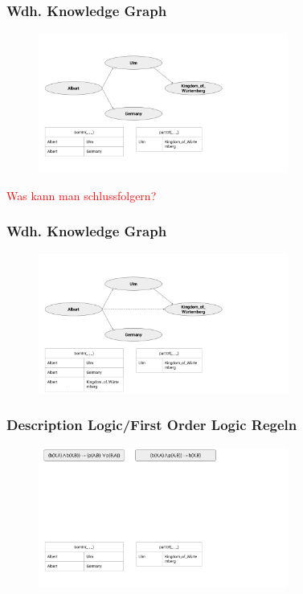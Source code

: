 \documentclass[aspectratio=169]{beamer}
\begin{document}
\begin{frame}\frametitle{Wdh. Knowledge Graph}
\begin{figure}
    \centering
    \includegraphics[width=0.73\textwidth]{1_LNN.png}
\end{figure}
\pause
\textcolor{red}{Was kann man schlussfolgern?}
\end{frame}

\begin{frame}\frametitle{Wdh. Knowledge Graph}
\begin{figure}
    \centering
    \includegraphics[width=0.73\textwidth]{2_LNN.png}
\end{figure}
\end{frame}

\begin{frame}\frametitle{Description Logic/First Order Logic Regeln}
\begin{figure}
    \centering
    \includegraphics[width=0.73\textwidth]{3_LNN.png}
\end{figure}
\end{frame}
\end{document}
